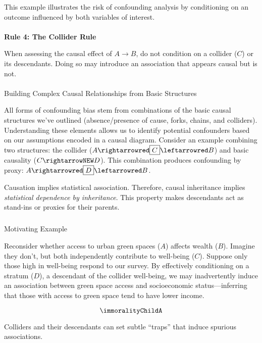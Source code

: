 \documentclass[
  singlecolumn]{article}
\makeatletter
\let\oldparagraph\paragraph
\renewcommand{\paragraph}{
    \@ifstar
      \xxxParagraphStar
      \xxxParagraphNoStar
  }
\newcommand{\xxxParagraphStar}[1]{\oldparagraph*{#1}\mbox{}}
\newcommand{\xxxParagraphNoStar}[1]{\oldparagraph{#1}\mbox{}}
\let\oldsubparagraph\subparagraph
\renewcommand{\subparagraph}{
    \@ifstar
      \xxxSubParagraphStar
      \xxxSubParagraphNoStar
  }
\newcommand{\xxxSubParagraphStar}[1]{\oldsubparagraph*{#1}\mbox{}}
\newcommand{\xxxSubParagraphNoStar}[1]{\oldsubparagraph{#1}\mbox{}}
\makeatother
\begin{document}
This example illustrates the risk of confounding analysis by
conditioning on an outcome influenced by both variables of interest.

\paragraph{\texorpdfstring{\textbf{Rule 4: The Collider
Rule}}{Rule 4: The Collider Rule}}\label{rule-4-the-collider-rule}

When assessing the causal effect of \(A \to B\), do not condition on a
collider (\(C\)) or its descendants. Doing so may introduce an
association that appears causal but is not.

\paragraph{Building Complex Causal Relationships from Basic
Structures}\label{building-complex-causal-relationships-from-basic-structures}

All forms of confounding bias stem from combinations of the basic causal
structures we've outlined (absence/presence of cause, forks, chains, and
colliders). Understanding these elements allows us to identify potential
confounders based on our assumptions encoded in a causal diagram.
Consider an example combining two structures: the collider
(\(A \rightarrowred \boxed{C} \leftarrowred B\)) and basic causality
(\(C \rightarrowNEW D\)). This combination produces confounding by
proxy: \(A \rightarrowred \boxed{D} \leftarrowred B\).

Causation implies statistical association. Therefore, causal inheritance
implies \emph{statistical dependence by inheritance}. This property
makes descendants act as stand-ins or proxies for their parents.

\subparagraph{Motivating Example}\label{motivating-example-4}

Reconsider whether access to urban green spaces (\(A\)) affects wealth
(\(B\)). Imagine they don't, but both independently contribute to
well-being (\(C\)). Suppose only those high in well-being respond to our
survey. By effectively conditioning on a stratum (\(D\)), a descendant
of the collider well-being, we may inadvertently induce an association
between green space access and socioeconomic status---inferring that
those with access to green space tend to have lower income.

\[
\immoralityChildA
\]

Colliders and their descendants can set subtle ``traps'' that induce
spurious associations.
\end{document}
